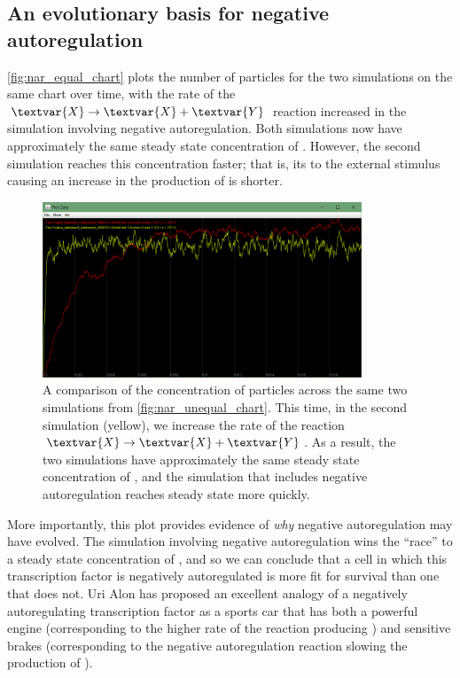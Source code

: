 
\FloatBarrier
{}
\subsection{An evolutionary basis for negative autoregulation}

\autoref{fig:nar_equal_chart} plots the number of  particles for the two simulations on the same chart over time, with the rate of the $\textvar{X} \rightarrow \textvar{X} + \textvar{Y}$ reaction increased in the simulation involving negative autoregulation. Both  simulations now have approximately the same steady state concentration of . However, the second simulation reaches this concentration faster; that is, its  to the external stimulus causing an increase in the production of  is shorter.\\

\begin{figure}[h]
\centering
\mySfFamily
\includegraphics[width = 0.85\textwidth]{../images/nar_equal_chart.png}
\caption{A comparison of the concentration of  particles across the same two simulations from \autoref{fig:nar_unequal_chart}. This time, in the second simulation (yellow), we increase the rate of the reaction $\textvar{X} \rightarrow \textvar{X} + \textvar{Y}$.  As a result, the two simulations have approximately the same steady state concentration of , and the simulation that includes negative autoregulation reaches steady state more quickly.}
\label{fig:nar_equal_chart}
\end{figure}

More importantly, this plot provides evidence of \textit{why} negative autoregulation may have evolved. The simulation involving negative autoregulation wins the ``race'' to a steady state concentration of , and so we can conclude that a cell in which this transcription factor is negatively autoregulated is more fit for survival than one that does not. Uri Alon has proposed an excellent analogy of a negatively autoregulating transcription factor as a sports car that has both a powerful engine (corresponding to the higher rate of the reaction producing ) and sensitive brakes (corresponding to the negative autoregulation reaction slowing the production of ).


